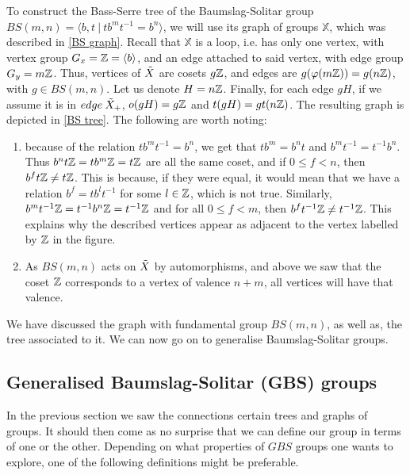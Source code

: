 \begin{importantexample}
    To construct the Bass-Serre tree of the Baumslag-Solitar group $BS(m,n) = \langle b,t \: | \: tb^mt^{-1} = b^n \rangle$, we will use its graph of groups $\mathbb{X}$, which was described in \ref{BS graph}. Recall that $\mathbb{X}$ is a loop, i.e. has only one vertex, with vertex group $G_x = \mathbb{Z} = \langle b\rangle$, and an edge attached to said vertex, with edge group $G_y = m\mathbb{Z}$. Thus, vertices of $\Tilde{X}$ are cosets $g\mathbb{Z}$, and edges are $g(\varphi(m\mathbb{Z})) = g(n\mathbb{Z})$, with $g \in BS(m,n)$. Let us denote $H=n\mathbb{Z}$. Finally, for each edge $gH$, if we assume it is in $edge \: \Tilde{X}_+$, $o(gH) = g\mathbb{Z}$ and $t(gH) = gt(n\mathbb{Z})$.
    The resulting graph is depicted in \ref{BS tree}.
    The following are worth noting:
    \begin{enumerate}
        \item because of the relation $tb^mt^{-1} = b^n$, we get that $tb^m = b^nt$ and $b^mt^{-1} = t^{-1}b^n$. Thus $b^nt\mathbb{Z} = tb^m\mathbb{Z} = t\mathbb{Z}$ are all the same coset, and if $0 \le f <n$, then $b^ft\mathbb{Z} \neq t\mathbb{Z}$. This is because, if they were equal, it would mean that we have a relation $b^f = tb^lt^{-1}$ for some $l \in \mathbb{Z}$, which is not true. Similarly, $b^mt^{-1}\mathbb{Z} = t^{-1}b^n\mathbb{Z} = t^{-1}\mathbb{Z}$ and for all $0 \le f <m$, then $b^ft^{-1}\mathbb{Z} \neq t^{-1}\mathbb{Z}$.
        This explains why the described vertices appear as adjacent to the vertex labelled by $\mathbb{Z}$ in the figure.
        \item As $BS(m,n)$ acts on $\Tilde{X}$ by automorphisms, and above we saw that the coset $\mathbb{Z}$ corresponds to a vertex of valence $n+m$, all vertices will have that valence. 
    \end{enumerate}
\end{importantexample}

We have discussed the graph with fundamental group $BS(m,n)$, as well as, the tree associated to it. We can now go on to generalise Baumslag-Solitar groups.

\subsection{Generalised Baumslag-Solitar (GBS) groups}

In the previous section we saw the connections certain trees and graphs of groups. It should then come as no surprise that we can define our group in terms of one or the other. Depending on what properties of $GBS$ groups one wants to explore, one of the following definitions might be preferable.

